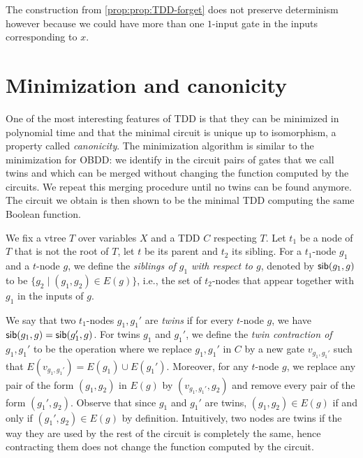 \documentclass[a4paper,UKenglish,cleveref, autoref, thm-restate]{lipics-v2021}
\begin{document}
\begin{toappendix}
The construction from \cref{prop:prop:TDD-forget} does not preserve determinism however because we could have more than one $1$-input gate in the inputs corresponding to $x$. %


\end{toappendix}


\section{Minimization and canonicity}
\label{sec:prop:minimization}

One of the most interesting features of TDD is that they can be minimized in polynomial time and that the minimal circuit is unique up to isomorphism, a property called \emph{canonicity}. The minimization algorithm is similar to the minimization for OBDD: we identify in the circuit pairs of gates that we call twins and which can be merged without changing the function computed by the circuits. We repeat this merging procedure until no twins can be found anymore. The circuit we obtain is then shown to be the minimal TDD computing the same Boolean function. 

We fix a vtree $T$ over variables $X$ and a TDD $C$ respecting $T$. Let $t_1$ be a node of $T$ that is not the root of $T$, let $t$ be its parent and $t_2$ its sibling. For a $t_1$-node $g_1$ and a $t$-node $g$, we define the \emph{siblings of $g_1$ with respect to $g$}, denoted by $\sib[g]$ to be $\{g_2 \mid (g_1,g_2) \in E(g)\}$, i.e., the set of $t_2$-nodes that appear together with $g_1$ in the inputs of $g$. 

We say that two $t_1$-nodes $g_1,g_1'$ are \emph{twins} if for every $t$-node $g$, we have $\sib[g] = \sib[g][g_1']$. For twins $g_1$ and $g_1'$, we define the \emph{twin contraction of $g_1,g_1'$} to be the operation where we replace $g_1,g_1'$ in $C$ by a new gate $v_{g_1,g_1'}$ such that $E(v_{g_1,g_1'}) = E(g_1) \cup E(g_1')$. Moreover, for any $t$-node $g$, we replace any pair of the form $(g_1,g_2)$ in $E(g)$ by $(v_{g_1,g_1'},g_2)$ and remove every pair of the form $(g_1',g_2)$. Observe that since $g_1$ and $g_1'$ are twins, $(g_1,g_2) \in E(g)$ if and only if $(g_1',g_2) \in E(g)$ by definition. Intuitively, two nodes are twins if the way they are used by the rest of the circuit is completely the same, hence contracting them does not change the function computed by the circuit.
\end{document}
